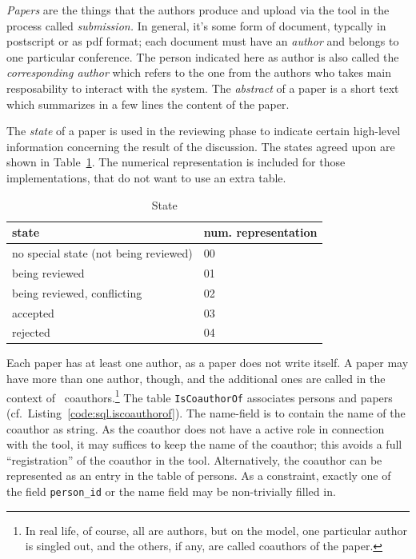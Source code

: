 \emph{Papers} are the things that the authors produce and upload via the
tool in the process called \emph{submission.} In general, it's some form of
document, typcally in postscript or as pdf format; each document must have
an \emph{author} and belongs to one particular conference. The person
indicated here as author is also called the \emph{corresponding author}
which refers to the one from the authors who takes main resposability to
interact with the system.
%
The \emph{abstract} of a paper is a short text which summarizes in a few
lines the content of the paper.

%

The \emph{state} of a paper is used in the reviewing phase to indicate
certain high-level information concerning the result of the discussion.
 The states agreed upon are shown in
Table~\ref{tab:paper.state}. The numerical representation is included for
those implementations, that do not want to use an extra table.



\begin{table}[htbp]
  \centering
  \begin{tabular}{ll}
    state & num. representation
    \\\hline
    no special state (not being reviewed) & 00
    \\
    being reviewed
    & 
    01
    \\
    being reviewed, conflicting
    &
    02
    \\
    accepted
    &
    03
    \\
    rejected
    &
    04
  \end{tabular}
  \caption{State}
  \label{tab:paper.state}
\end{table}


Each paper has at least one author, as a paper does not write itself. A paper
may have more than one author, though, and the additional ones are called in
the context of \Coma\ coauthors.\footnote{In real life, of course, all are
  authors, but on the model, one particular author is singled out, and the
  others, if any, are called coauthors of the paper.} 
%
The table \texttt{IsCoauthorOf} associates persons and papers (cf.\ 
Listing~\ref{code:sql.iscoauthorof}). The name-field is to contain the name of
the coauthor as string.  As the coauthor does not have a active role in
connection with the tool, it may suffices to keep the name of the coauthor;
this avoids a full ``registration'' of the coauthor in the tool.
Alternatively, the coauthor can be represented as an entry in the table of
persons. As a constraint, exactly one of the field \texttt{person\_id} or the
name field may be non-trivially filled in.


